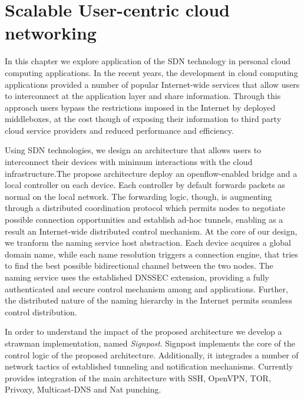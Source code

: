 \chapter{Scalable User-centric cloud networking}
\ifpdf
    \graphicspath{{Chapter3/Chapter3Figs/PNG/}{Chapter3/Chapter3Figs/PDF/}{Chapter3/Chapter3Figs/}}
\else
    \graphicspath{{Chapter3/Chapter3Figs/EPS/}{Chapter3/Chapter3Figs/}}
\fi

In this chapter we explore application of the SDN technology in personal cloud
computing applications. In the recent years, the development in cloud computing
applications provided a number of popular Internet-wide services that allow
users to interconnect at the application layer and share information. Through
this approach users bypass the restrictions imposed in the Internet by deployed
middleboxes, at the cost though of exposing their information to third party
cloud service providers and reduced performance and efficiency. 

Using SDN technologies, we design an architecture that allows users to
interconnect their devices with minimum interactions with the cloud
infrastructure.The propose architecture deploy an openflow-enabled bridge and a
local controller on each device. Each controller by default forwards packets as
normal on the local network. The forwarding logic, though,  is augmenting
through a distributed coordination protocol which permits nodes to negotiate
possible connection opportunities and establish ad-hoc tunnels, enabling as a
result an Internet-wide distributed control mechanism. At the core of
our design, we tranform the naming service host abstraction. Each device
acquires a global domain name, while each name resolution triggers a connection
engine, that tries to find the best possible bidirectional channel between the
two nodes. The naming service uses the established
DNSSEC extension, providing a fully authenticated and secure control
mechanism among \signpost and applications. Further, the distributed nature
of the naming hierarchy in the Internet permits seamless control distribution.

In order to understand the impact of the proposed architecture we develop a
strawman implementation, named {\it Signpost}. Signpost implements the core of
the control logic of the proposed architecture. Additionally, it integrades a
number of network tactics of established tunneling and notification mechanisms.
Currently \signpost provides integration of the main architecture with SSH, OpenVPN,
TOR, Privoxy, Multicast-DNS and Nat punching. 

